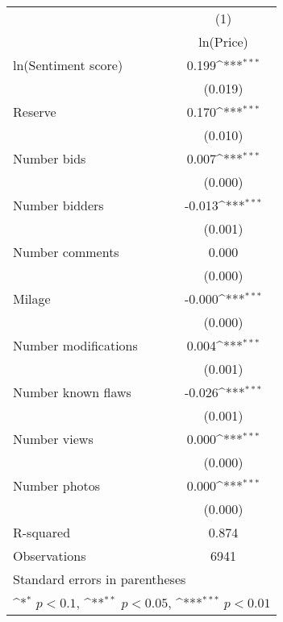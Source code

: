 {
\def\sym#1{\ifmmode^{#1}\else\(^{#1}\)\fi}
\begin{tabular}{l*{1}{c}}
\hline\hline
                    &\multicolumn{1}{c}{(1)}\\
                    &\multicolumn{1}{c}{ln(Price)}\\
\hline
ln(Sentiment score) &       0.199\sym{***}\\
                    &     (0.019)         \\
[1em]
Reserve             &       0.170\sym{***}\\
                    &     (0.010)         \\
[1em]
Number bids         &       0.007\sym{***}\\
                    &     (0.000)         \\
[1em]
Number bidders      &      -0.013\sym{***}\\
                    &     (0.001)         \\
[1em]
Number comments     &       0.000         \\
                    &     (0.000)         \\
[1em]
Milage              &      -0.000\sym{***}\\
                    &     (0.000)         \\
[1em]
Number modifications&       0.004\sym{***}\\
                    &     (0.001)         \\
[1em]
Number known flaws  &      -0.026\sym{***}\\
                    &     (0.001)         \\
[1em]
Number views        &       0.000\sym{***}\\
                    &     (0.000)         \\
[1em]
Number photos       &       0.000\sym{***}\\
                    &     (0.000)         \\
\hline
R-squared           &       0.874         \\
Observations        &        6941         \\
\hline\hline
\multicolumn{2}{l}{\footnotesize Standard errors in parentheses}\\
\multicolumn{2}{l}{\footnotesize \sym{*} \(p<0.1\), \sym{**} \(p<0.05\), \sym{***} \(p<0.01\)}\\
\end{tabular}
}
